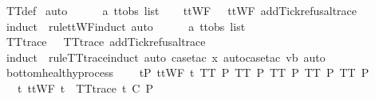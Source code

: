 \begin{isabellebody}
\ TT{}{\isacharunderscore}def\isanewline
{}\isamarkupfalse%
\ auto\isanewline
\ \ \isamarkupfalse%
\ {\isasymrho}\ {\isacharcolon}{\isacharcolon}\ {\isachardoublequoteopen}{\isacharprime}a\ ttobs\ list{\isachardoublequoteclose}\isanewline
\ \ \isamarkupfalse%
\ {\isachardoublequoteopen}ttWF\ {\isasymrho}\ {\isasymLongrightarrow}\ ttWF\ {\isacharparenleft}add{\isacharunderscore}Tick{\isacharunderscore}refusal{\isacharunderscore}trace\ {\isasymrho}{\isacharparenright}{\isachardoublequoteclose}\isanewline
\ \ \ \ \isamarkupfalse%
\ {\isacharparenleft}induct\ {\isasymrho}\ rule{\isacharcolon}ttWF{\isachardot}induct{\isacharcomma}\ auto{\isacharparenright}\isanewline
{}\isamarkupfalse%
\isanewline
\ \ \isamarkupfalse%
\ {\isasymrho}\ {\isacharcolon}{\isacharcolon}\ {\isachardoublequoteopen}{\isacharprime}a\ ttobs\ list{\isachardoublequoteclose}\isanewline
\ \ \isamarkupfalse%
\ {\isachardoublequoteopen}TT{}{\isacharunderscore}trace\ {\isasymrho}\ {\isasymLongrightarrow}\ TT{}{\isacharunderscore}trace\ {\isacharparenleft}add{\isacharunderscore}Tick{\isacharunderscore}refusal{\isacharunderscore}trace\ {\isasymrho}{\isacharparenright}{\isachardoublequoteclose}\isanewline
\ \ \ \ \isamarkupfalse%
\ {\isacharparenleft}induct\ {\isasymrho}\ rule{\isacharcolon}TT{}{\isacharunderscore}trace{\isachardot}induct{\isacharcomma}\ auto{\isacharcomma}\ case{\isacharunderscore}tac\ x{\isacharcomma}\ auto{\isacharcomma}case{\isacharunderscore}tac\ vb{\isacharcomma}\ auto{\isacharparenright}\isanewline
{}\isamarkupfalse%
%
\endisatagproof
{\isafoldproof}%
%
\isadelimproof
\isanewline
%
\endisadelimproof
\isanewline
{}\isamarkupfalse%
\ bottom{\isacharunderscore}healthy{\isacharunderscore}process{\isacharcolon}\isanewline
\ \ \ {\isachardoublequoteopen}{\isasymforall}\ t{\isasymin}P{\isachardot}\ ttWF\ t{\isachardoublequoteclose}\ {\isachardoublequoteopen}TT{}\ P{\isachardoublequoteclose}\ {\isachardoublequoteopen}TT{}\ P{\isachardoublequoteclose}\ {\isachardoublequoteopen}TT{}\ P{\isachardoublequoteclose}\ {\isachardoublequoteopen}TT{}\ P{\isachardoublequoteclose}\ {\isachardoublequoteopen}TT{}\ P{\isachardoublequoteclose}\isanewline
\ \ \ {\isachardoublequoteopen}{\isacharbraceleft}t{\isachardot}\ ttWF\ t\ {\isasymand}\ TT{}{\isacharunderscore}trace\ t{\isacharbraceright}\ {\isasymsqsubseteq}\isactrlsub C\ P{\isachardoublequoteclose}\isanewline

\end{isabellebody}
